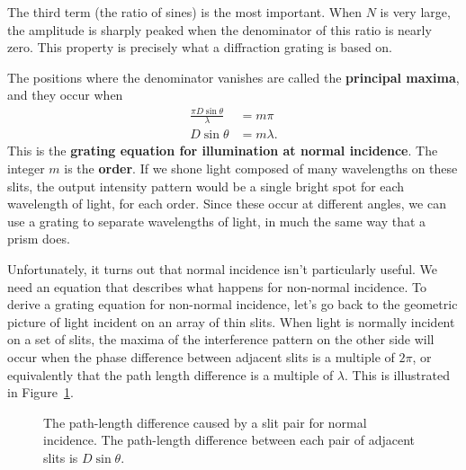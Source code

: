 \documentclass[]{manual}
\begin{document}
    The third term (the ratio of sines) is the most important.
    When $N$ is very large, the amplitude is sharply peaked when the denominator of this ratio is nearly zero.
    This property is precisely what a diffraction grating is based on.

    The positions where the denominator vanishes are called the \textbf{principal maxima}, and they occur when
    \begin{align} \label{eqn:normal-grating-equation}
        \frac{\pi D \sin{\theta}}{\lambda} &= m \pi \nonumber \\
        D \sin{\theta} &= m \lambda.
    \end{align}
    This is the \textbf{grating equation for illumination at normal incidence}.
    The integer $m$ is the \textbf{order}.
    If we shone light composed of many wavelengths on these slits, the output intensity pattern would be a single bright spot for each wavelength of light, for each order.
    Since these occur at different angles, we can use a grating to separate wavelengths of light, in much the same way that a prism does.

    Unfortunately, it turns out that normal incidence isn't particularly useful.
    We need an equation that describes what happens for non-normal incidence.
    To derive a grating equation for non-normal incidence, let's go back to the geometric picture of light incident on an array of thin slits.
    When light is normally incident on a set of slits, the maxima of the interference pattern on the other side will occur when the phase difference between adjacent slits is a multiple of $2 \pi$, or equivalently that the path length difference is a multiple of $\lambda$.
    This is illustrated in Figure~\ref{fig:path-length-difference-normal}.

    \begin{figure}[H]
        \centering


        \caption[Path-Length Difference for Normal Incidence]{
            The path-length difference caused by a slit pair for normal incidence.
            The path-length difference between each pair of adjacent slits is $D \sin\theta$.
        }

        \label{fig:path-length-difference-normal}
    \end{figure}
\end{document}
